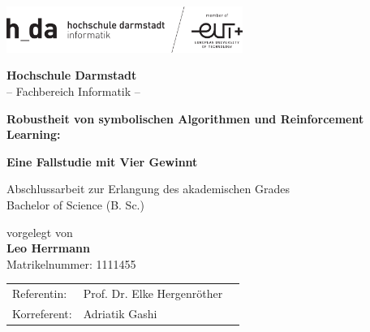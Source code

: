 \thispagestyle{empty}
\begin{titlepage}
 \begin{center}
    \includegraphics[width=7.7cm]{logo_h-da_neu} \\ 
  \end{center}

  \begin{center}
    \vspace{0.1cm}
    \huge \textbf{Hochschule Darmstadt}\\
    \vspace{0.4cm}
    \LARGE -- Fachbereich Informatik --
  \end{center}

  \vfill
  \vfill

  \begin{center}
    \LARGE \textbf{Robustheit von symbolischen Algorithmen und Reinforcement Learning:}
    
    \LARGE \textbf{Eine Fallstudie mit Vier Gewinnt}
    
  \end{center} 
  
  \vfill
  \vfill

  \begin{center}
	\Large Abschlussarbeit zur Erlangung des akademischen Grades\\
	\vspace{0.3cm}
	\Large Bachelor of Science (B. Sc.)\\
  \end{center}

  \vfill

  \begin{center}
    \Large vorgelegt von\\
    \vspace{0.3cm}
    \Large \textbf{Leo Herrmann}\\
    \vspace{0.3cm}
    \normalsize Matrikelnummer: 1111455
  \end{center}
    \vfill
  \vfill

  \begin{center}
    \begin{tabular}{lll}
      Referentin:    & Prof. Dr. Elke Hergenröther \\
      Korreferent: & Adriatik Gashi				 \\
    \end{tabular}
  \end{center} 
\end{titlepage}
